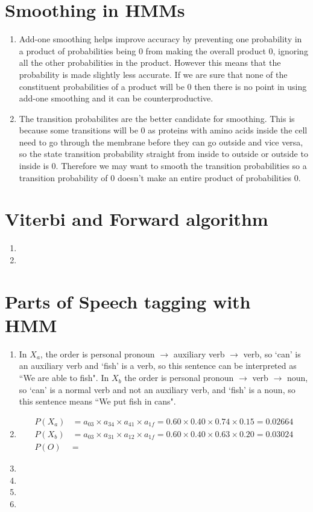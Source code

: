 \documentclass[12pt]{article}
\begin{document}
\section*{Smoothing in HMMs}
\begin{enumerate}
    \item Add-one smoothing helps improve accuracy by preventing one probability in a product of probabilities being 0 from making the overall product 0, ignoring all the other probabilities in the product. However this means that the probability is made slightly less accurate. If we are sure that none of the constituent probabilities of a product will be 0 then there is no point in using add-one smoothing and it can be counterproductive.
    \item The transition probabilites are the better candidate for smoothing. This is because some transitions will be 0 as proteins with amino acids inside the cell need to go through the membrane before they can go outside and vice versa, so the state transition probability straight from inside to outside or outside to inside is 0. Therefore we may want to smooth the transition probabilities so a transition probability of 0 doesn't make an entire product of probabilities 0.
\end{enumerate}

\section*{Viterbi and Forward algorithm}
\begin{enumerate}
    \item 
    \item 
\end{enumerate}

\section*{Parts of Speech tagging with HMM}
\begin{enumerate}
    \item In $X_a$, the order is personal pronoun $\rightarrow$ auxiliary verb $\rightarrow$ verb, so `can' is an auxiliary verb and `fish' is a verb, so this sentence can be interpreted as ``We are able to fish".
    In $X_b$ the order is personal pronoun $\rightarrow$ verb $\rightarrow$ noun, so `can' is a normal verb and not an auxiliary verb, and `fish' is a noun, so this sentence means ``We put fish in cans".
    \item \begin{align*}
        P(X_a) &= a_{03} \times a_{34} \times a_{41} \times a_{1f} = 0.60 \times 0.40 \times 0.74 \times 0.15 = 0.02664\\
        P(X_b) &= a_{03} \times a_{31} \times a_{12} \times a_{1f} = 0.60 \times 0.40 \times 0.63 \times 0.20 = 0.03024\\
        P(O) &= 
    \end{align*}
    \item 
    \item 
    \item 
    \item 
\end{enumerate}
\end{document}
